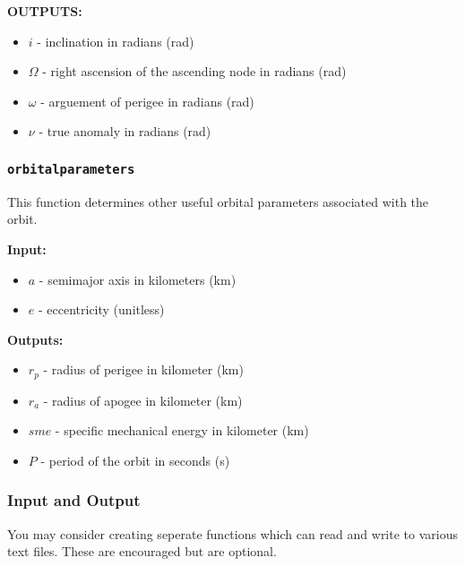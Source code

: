 \documentclass[11pt, reqno]{article}    %
\begin{document}
\noindent \textbf{OUTPUTS:}
\begin{itemize}
    \item \( i \) - inclination in radians (\si{\radian})
    \item \( \Omega \) - right ascension of the ascending node in radians (\si{\radian})
    \item \( \omega \) - arguement of perigee in radians (\si{\radian})
    \item \( \nu \) - true anomaly in radians (\si{\radian})
\end{itemize}

\subsubsection*{\texttt{orbitalparameters}}
This function determines other useful orbital parameters associated with the orbit.

\noindent \textbf{Input:}
\begin{itemize}
    \item \( a \)  - semimajor axis in kilometers (\si{\kilo\meter})
    \item \( e \) - eccentricity (unitless)
\end{itemize}

\noindent \textbf{Outputs:}
\begin{itemize}
    \item \( r_p \) - radius of perigee in kilometer (\si{\kilo\meter})
    \item \( r_a \) - radius of apogee in kilometer (\si{\kilo\meter})
    \item \( sme \) - specific mechanical energy in kilometer (\si{\kilo\meter})
    \item \( P \) - period of the orbit in seconds (\si{\second})
\end{itemize}

\subsubsection*{Input and Output}

You may consider creating seperate functions which can read and write to various text files. 
These are encouraged but are optional.
\end{document}
